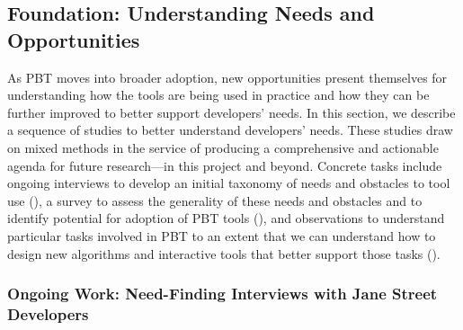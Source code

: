 




\subsection{Foundation: Understanding Needs and Opportunities }\label{sec:foundation}

As PBT moves into broader adoption, new opportunities present
themselves for understanding how
the tools are being used in practice and how they can be further
improved to better support developers' needs. In this section, we describe a
sequence of studies to better understand developers' needs.
These studies draw on mixed methods in the service of producing a
comprehensive and actionable agenda for future research---in this
project and beyond.  Concrete tasks include ongoing interviews to
develop an initial taxonomy of needs and
obstacles to tool use (), a survey to assess the
generality of these needs and obstacles and to identify potential for adoption
of PBT tools (), and observations to understand
particular tasks involved in PBT to an extent that we can understand how to
design new algorithms and interactive tools that better support those tasks
().

\subsubsection{Ongoing Work: Need-Finding Interviews with Jane Street Developers}
\label{sec:interviews}


